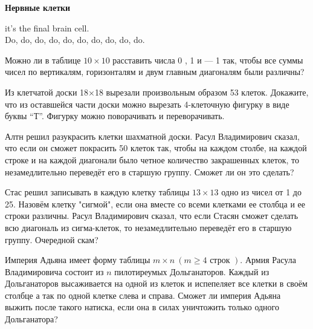\centerline{\bf \Huge Нервные клетки}
\centerline{\bf \Huge }

\begin{flushright}
        \scriptsize{it's the final brain cell.\\ Do, do, do, do, do, do, do, do, do, do.}
\end{flushright}

Можно ли в таблице $10 \times 10$ расставить числа 0  , 1 и --- 1 так, чтобы все суммы чисел по вертикалям, горизонталям и двум главным диагоналям были различны?

Из клетчатой доски 18×18 вырезали произвольным образом 53   клеток. Докажите, что из оставшейся части доски можно вырезать 4-клеточную фигурку в виде буквы “Т”. Фигурку можно поворачивать и переворачивать.

Алтн решил разукрасить клетки шахматной доски. Расул Владимирович сказал, что если он сможет покрасить 50 клеток так, чтобы на каждом столбе, на каждой строке и на каждой диагонали было четное количество закрашенных клеток, то незамедлительно переведёт его в старшую группу. Сможет ли он это сделать?

Стас решил записывать в каждую клетку таблицы $13 \times 13$ одно из чисел от 1 до 25. Назовём клетку "сигмой"\!, если она вместе со всеми клетками ее столбца и ее строки различны. Расул Владимирович сказал, что если Стасян сможет сделать всю диагональ из сигма-клеток, то незамедлительно переведёт его в старшую группу. Очередной скам?

Империя Адьяна имеет форму таблицы $m \times n \ (m \geq 4 \text{ строк })$. Армия Расула Владимировича состоит из $n$ пилотиреумых Дольганаторов. Каждый из Дольганаторов высаживается на одной из клеток и испепеляет все клетки в своём столбце а так по одной клетке слева и справа. Сможет ли империя Адьяна выжить после такого натиска, если она в силах уничтожить только одного Дольганатора?